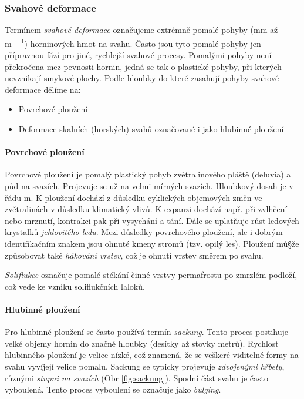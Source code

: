 \subsubsection{Svahové deformace}
Termínem \emph{svahové deformace} označujeme extrémně pomalé pohyby (\si{\milli\metre} až \si{\metre\per\rok}) horninových hmot na svahu. Často jsou tyto pomalé pohyby jen přípravnou fází pro jiné, rychlejší svahové procesy. Pomalými pohyby není překročena mez pevnosti hornin, jedná se tak o plastické pohyby, při kterých nevznikají smykové plochy. Podle hloubky do které zasahují pohyby svahové deformace dělíme na:

\begin{itemize}
	\item Povrchové ploužení
	\item Deformace skalních (horských) svahů označované i jako hlubinné ploužení
\end{itemize}

\paragraph{Povrchové ploužení}
Povrchové ploužení je pomalý plastický pohyb zvětralinového pláště (deluvia) a půd na svazích. Projevuje se už na velmi mírných svazích. Hloubkový dosah je v řádu \si{\metre}. K ploužení dochází z důsledku cyklických objemových změn ve zvětralinách v důsledku klimatický vlivů. K expanzi dochází např. při zvlhčení nebo mrznutí, kontrakci pak při vysychání a tání. Dále se uplatňuje růst ledových krystalků \emph{jehlovitého ledu}. Mezi důsledky povrchového ploužení, ale i dobrým identifikačním znakem jsou ohnuté kmeny stromů (tzv. opilý les). Ploužení mů§že způsobovat také  \emph{hákování vrstev}, což je ohnutí vrstev směrem po svahu. 

\emph{Soliflukce} označuje pomalé stékání činné vrstvy permafrostu po zmrzlém podloží, což vede ke vzniku soliflukčních laloků.

\paragraph{Hlubinné ploužení}
Pro hlubinné ploužení se často používá termín \emph{sackung}. Tento proces postihuje velké objemy hornin do značné hloubky (desítky až stovky metrů). Rychlost hlubinného ploužení je velice nízké, což znamená, že se veškeré viditelné formy na svahu vyvíjejí velice pomalu. Sackung se typicky projevuje \emph{zdvojenými hřbety}, různými \emph{stupni na svazích} (Obr \ref{fig:sackung}). Spodní část svahu je často vyboulená. Tento proces vyboulení se označuje jako \emph{bulging}.

